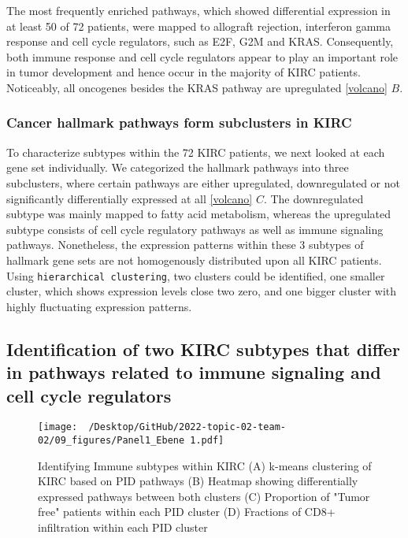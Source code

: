 \documentclass[
  parskip,
  oneside]{scrreprt}
\begin{document}
The most frequently enriched pathways, which showed differential
expression in at least 50 of 72 patients, were mapped to allograft
rejection, interferon gamma response and cell cycle regulators, such as
E2F, G2M and KRAS. Consequently, both immune response and cell cycle
regulators appear to play an important role in tumor development and
hence occur in the majority of KIRC patients. Noticeably, all oncogenes
besides the KRAS pathway are upregulated \cref{volcano} \(B\).

\hypertarget{cancer-hallmark-pathways-form-subclusters-in-kirc}{%
\subsubsection{Cancer hallmark pathways form subclusters in
KIRC}\label{cancer-hallmark-pathways-form-subclusters-in-kirc}}

To characterize subtypes within the 72 KIRC patients, we next looked at
each gene set individually. We categorized the hallmark pathways into
three subclusters, where certain pathways are either upregulated,
downregulated or not significantly differentially expressed at all
\cref{volcano} \(C\). The downregulated subtype was mainly mapped to
fatty acid metabolism, whereas the upregulated subtype consists of cell
cycle regulatory pathways as well as immune signaling pathways.
Nonetheless, the expression patterns within these 3 subtypes of hallmark
gene sets are not homogenously distributed upon all KIRC patients. Using
\texttt{hierarchical\ clustering}, two clusters could be identified, one
smaller cluster, which shows expression levels close two zero, and one
bigger cluster with highly fluctuating expression patterns.

\hypertarget{identification-of-two-kirc-subtypes-that-differ-in-pathways-related-to-immune-signaling-and-cell-cycle-regulators}{%
\subsection{Identification of two KIRC subtypes that differ in pathways
related to immune signaling and cell cycle
regulators}\label{identification-of-two-kirc-subtypes-that-differ-in-pathways-related-to-immune-signaling-and-cell-cycle-regulators}}

\begin{figure}[h]
  \texttt{[image: ~/Desktop/GitHub/2022-topic-02-team-02/09\_figures/Panel1\_Ebene 1.pdf]}
  \caption{Identifying Immune subtypes within KIRC (A) k-means clustering of KIRC based on PID pathways (B) Heatmap showing differentially expressed pathways between both clusters (C) Proportion of "Tumor free" patients within each PID cluster (D) Fractions of CD8+ infiltration within each PID cluster}
  \label{pid}
\end{figure}
\end{document}
